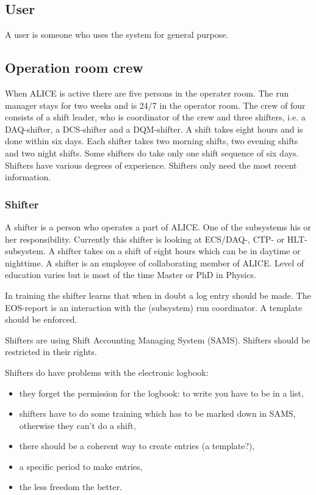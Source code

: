 \subsection{User}
A user is someone who uses the system for general purpose.

\subsection{Operation room crew}
When ALICE is active there are five persons in the operater room. The run manager stays for two weeks and is 24/7 in the operator room. The crew of four consists of a shift leader, who is coordinator of the crew and three shifters, i.e. a DAQ-shifter, a DCS-shifter and a DQM-shifter. A shift takes eight hours and is done within six days. Each shifter takes two morning shifts, two evening shifts and two night shifts. Some shifters do take only one shift sequence of six days. Shifters have various degrees of experience. Shifters only need the most recent information. 

\subsubsection{Shifter}
A shifter is a person who operates a part of ALICE. One of the subsystems his or her responsibility. Currently this shifter is looking at ECS/DAQ-, CTP- or HLT-subsystem. A shifter takes on a shift of eight hours which can be in daytime or nighttime. A shifter is an employee of collaborating member of ALICE. Level of education varies but is most of the time Master or PhD in Physics.

In training the shifter learns that when in doubt a log entry should be made. The EOS-report is an interaction with the (subsystem) run coordinator. A template should be enforced. 

Shifters are using Shift Accounting Managing System (SAMS). Shifters should be restricted in their rights. 

Shifters do have problems with the electronic logbook:
\begin{itemize}
  \item they forget the permission for the logbook: to write you have to be in a list,
  \item shifters have to do some training which has to be marked down in SAMS, otherwise they can't do a shift,
  \item there should be a coherent way to create entries (a template?),
  \item a specific period to make entries,
  \item the less freedom the better.
\end{itemize}

